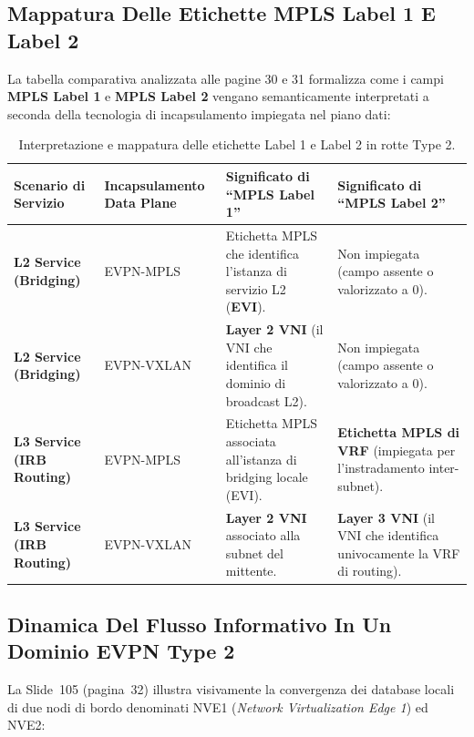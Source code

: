 \documentclass[11pt, a4paper]{article}
\begin{document}
\subsection{Mappatura Delle Etichette MPLS Label 1 E Label 2}

La tabella comparativa analizzata alle pagine 30 e 31 formalizza come i campi \textbf{MPLS Label 1} e \textbf{MPLS Label 2} vengano semanticamente interpretati a seconda della tecnologia di incapsulamento impiegata nel piano dati:

\begin{table}[H]
\centering
\small
\begin{tabularx}{\textwidth}{l p{3.5cm} X X}
\toprule
\textbf{Scenario di Servizio} & \textbf{Incapsulamento Data Plane} & \textbf{Significato di ``MPLS Label 1''} & \textbf{Significato di ``MPLS Label 2''} \\
\midrule
\textbf{L2 Service (Bridging)} &
EVPN-MPLS &
Etichetta MPLS che identifica l'istanza di servizio L2 (\textbf{EVI}). &
Non impiegata (campo assente o valorizzato a $0$). \\
\addlinespace
\textbf{L2 Service (Bridging)} &
EVPN-VXLAN &
\textbf{Layer 2 VNI} (il VNI che identifica il dominio di broadcast L2). &
Non impiegata (campo assente o valorizzato a $0$). \\
\addlinespace
\textbf{L3 Service (IRB Routing)} &
EVPN-MPLS &
Etichetta MPLS associata all'istanza di bridging locale (EVI). &
\textbf{Etichetta MPLS di VRF} (impiegata per l'instradamento inter-subnet). \\
\addlinespace
\textbf{L3 Service (IRB Routing)} &
EVPN-VXLAN &
\textbf{Layer 2 VNI} associato alla subnet del mittente. &
\textbf{Layer 3 VNI} (il VNI che identifica univocamente la VRF di routing). \\
\bottomrule
\end{tabularx}
\caption{Interpretazione e mappatura delle etichette Label 1 e Label 2 in rotte Type 2.}
\end{table}

\subsection{Dinamica Del Flusso Informativo In Un Dominio EVPN Type 2}

La Slide~105 (pagina~32) illustra visivamente la convergenza dei database locali di due nodi di bordo denominati NVE1 (\emph{Network Virtualization Edge 1}) ed NVE2:

\end{document}
